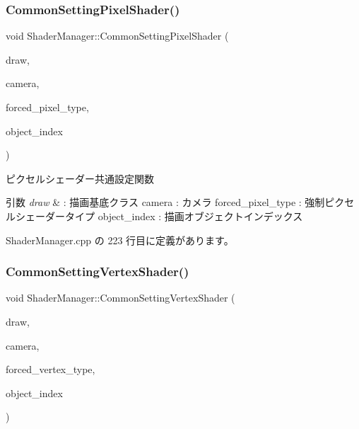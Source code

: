 \subsubsection{\texorpdfstring{Common\+Setting\+Pixel\+Shader()}{CommonSettingPixelShader()}}
{\footnotesize\ttfamily void Shader\+Manager\+::\+Common\+Setting\+Pixel\+Shader (\begin{DoxyParamCaption}\item[{\mbox{\hyperlink{class_draw_base}{Draw\+Base}} $\ast$}]{draw,  }\item[{\mbox{\hyperlink{class_camera}{Camera}} $\ast$}]{camera,  }\item[{\mbox{\hyperlink{class_shader_manager_a7d15d773b3c6a99dd7086c45c8b0be5f}{Pixel\+Shader\+Type}}}]{forced\+\_\+pixel\+\_\+type,  }\item[{unsigned}]{object\+\_\+index }\end{DoxyParamCaption})\hspace{0.3cm}{\ttfamily [private]}}



ピクセルシェーダー共通設定関数 


\begin{DoxyParams}{引数}
{\em draw} & \+: 描画基底クラス camera \+: カメラ forced\+\_\+pixel\+\_\+type \+: 強制ピクセルシェーダータイプ object\+\_\+index \+: 描画オブジェクトインデックス \\
\hline
\end{DoxyParams}


 Shader\+Manager.\+cpp の 223 行目に定義があります。

\mbox{\label{class_shader_manager_a836c92ee48dfbf8b8c8085f9413027bd}} 
\subsubsection{\texorpdfstring{Common\+Setting\+Vertex\+Shader()}{CommonSettingVertexShader()}}
{\footnotesize\ttfamily void Shader\+Manager\+::\+Common\+Setting\+Vertex\+Shader (\begin{DoxyParamCaption}\item[{\mbox{\hyperlink{class_draw_base}{Draw\+Base}} $\ast$}]{draw,  }\item[{\mbox{\hyperlink{class_camera}{Camera}} $\ast$}]{camera,  }\item[{\mbox{\hyperlink{class_shader_manager_a9b51e49d70eb3cc58f6d1f3994e8cfbd}{Vertex\+Shader\+Type}}}]{forced\+\_\+vertex\+\_\+type,  }\item[{unsigned}]{object\+\_\+index }\end{DoxyParamCaption})\hspace{0.3cm}{\ttfamily [private]}}



